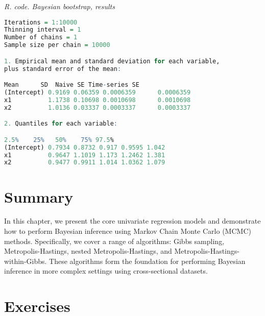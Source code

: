 \begin{tcolorbox}[enhanced,width=4.67in,center upper,
	fontupper=\large\bfseries,drop shadow southwest,sharp corners]
	\textit{R. code. Bayesian bootstrap, results}
	\begin{VF}
		\begin{lstlisting}[language=R]
Iterations = 1:10000
Thinning interval = 1 
Number of chains = 1 
Sample size per chain = 10000 

1. Empirical mean and standard deviation for each variable,
plus standard error of the mean:

Mean      SD  Naive SE Time-series SE
(Intercept) 0.9169 0.06359 0.0006359      0.0006359
x1          1.1738 0.10698 0.0010698      0.0010698
x2          1.0136 0.03337 0.0003337      0.0003337

2. Quantiles for each variable:

2.5%    25%   50%    75% 97.5%
(Intercept) 0.7934 0.8732 0.917 0.9595 1.042
x1          0.9647 1.1019 1.173 1.2462 1.381
x2          0.9477 0.9911 1.014 1.0362 1.079
\end{lstlisting}
	\end{VF}
\end{tcolorbox} 


\section{Summary}\label{sec611}
In this chapter, we present the core univariate regression models and demonstrate how to perform Bayesian inference using Markov Chain Monte Carlo (MCMC) methods. Specifically, we cover a range of algorithms: Gibbs sampling, Metropolis-Hastings, nested Metropolis-Hastings, and Metropolis-Hastings-within-Gibbs. These algorithms form the foundation for performing Bayesian inference in more complex settings using cross-sectional datasets.

\section{Exercises}\label{sec612}

